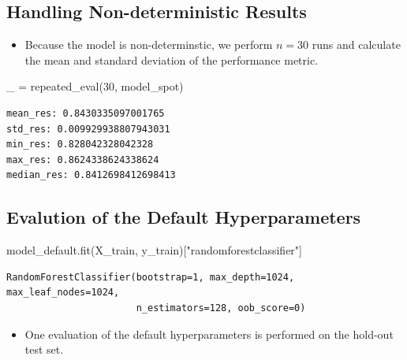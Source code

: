 \documentclass[
  letterpaper,
  DIV=11,
  numbers=noendperiod]{scrreprt}
\newenvironment{Shaded}{\begin{snugshade}}{\end{snugshade}}
\newcommand{\DecValTok}[1]{\textcolor[rgb]{0.68,0.00,0.00}{#1}}
\newcommand{\NormalTok}[1]{\textcolor[rgb]{0.00,0.23,0.31}{#1}}
\newcommand{\OperatorTok}[1]{\textcolor[rgb]{0.37,0.37,0.37}{#1}}
\newcommand{\StringTok}[1]{\textcolor[rgb]{0.13,0.47,0.30}{#1}}
\providecommand{\tightlist}{%
  \setlength{\itemsep}{0pt}\setlength{\parskip}{0pt}}\usepackage{longtable,booktabs,array}
\begin{document}
\hypertarget{handling-non-deterministic-results}{%
\subsection{Handling Non-deterministic
Results}\label{handling-non-deterministic-results}}

\begin{itemize}
\tightlist
\item
  Because the model is non-determinstic, we perform \(n=30\) runs and
  calculate the mean and standard deviation of the performance metric.
\end{itemize}

\begin{Shaded}
\begin{Highlighting}[]
\NormalTok{\_ }\OperatorTok{=}\NormalTok{ repeated\_eval(}\DecValTok{30}\NormalTok{, model\_spot)}
\end{Highlighting}
\end{Shaded}

\begin{verbatim}
mean_res: 0.8430335097001765
std_res: 0.009929938807943031
min_res: 0.828042328042328
max_res: 0.8624338624338624
median_res: 0.8412698412698413
\end{verbatim}

\hypertarget{evalution-of-the-default-hyperparameters}{%
\subsection{Evalution of the Default
Hyperparameters}\label{evalution-of-the-default-hyperparameters}}

\begin{Shaded}
\begin{Highlighting}[]
\NormalTok{model\_default.fit(X\_train, y\_train)[}\StringTok{"randomforestclassifier"}\NormalTok{]}
\end{Highlighting}
\end{Shaded}

\begin{verbatim}
RandomForestClassifier(bootstrap=1, max_depth=1024, max_leaf_nodes=1024,
                       n_estimators=128, oob_score=0)
\end{verbatim}

\begin{itemize}
\tightlist
\item
  One evaluation of the default hyperparameters is performed on the
  hold-out test set.
\end{itemize}
\end{document}
